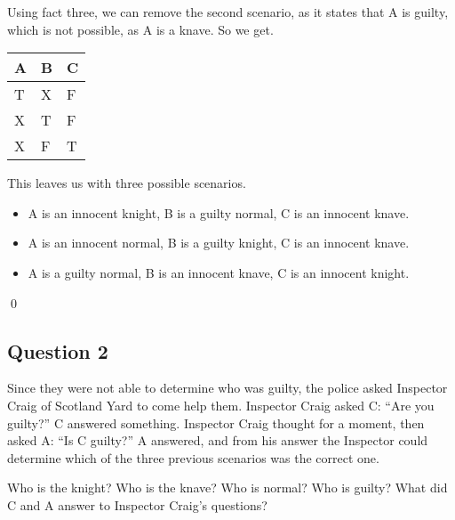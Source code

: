 \documentclass{article}
\begin{document}
\begin{addmargin}[0.75cm]{0cm}
	Using fact three, we can remove the second scenario, as it states that A is guilty, which is not possible, as A is a knave. So we get.
	
	\begin{center}
		\begin{tabular}{ L L L }
			A & B & C \\
			\hline
			T & X & F \\  
			X & T & F \\ 
			X & F & T
		\end{tabular}
	\end{center}
	
	This leaves us with three possible scenarios.
	
	\begin{itemize}[noitemsep, nolistsep]
		\item A is an innocent knight, B is a guilty normal, C is an innocent knave.
		\item A is an innocent normal, B is a guilty knight, C is an innocent knave.
		\item A is a guilty normal, B is an innocent knave, C is an innocent knight.
	\end{itemize}
	
	\qed
\end{addmargin}

\pagebreak


\subsection{Question 2} 
Since they were not able to determine who was guilty, the police asked Inspector
Craig of Scotland Yard to come help them. Inspector Craig asked C: “Are you guilty?” C
answered something. Inspector Craig thought for a moment, then asked A: “Is C guilty?”
A answered, and from his answer the Inspector could determine which of the three previous
scenarios was the correct one.


Who is the knight? Who is the knave? Who is normal? Who is guilty? What did C and A
answer to Inspector Craig’s questions?
\end{document}
